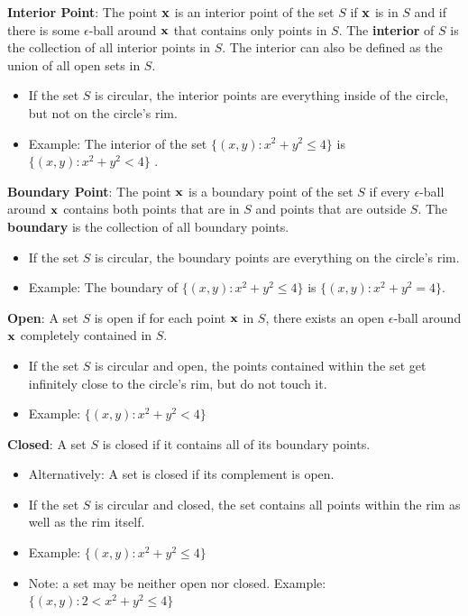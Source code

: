 \documentclass[]{book}
\providecommand{\tightlist}{%
  \setlength{\itemsep}{0pt}\setlength{\parskip}{0pt}}
\theoremstyle{definition}
\theoremstyle{definition}
\theoremstyle{definition}
\theoremstyle{remark}
\begin{document}
\textbf{Interior Point}: The point \(\bf x\) is an interior point of the
set \(S\) if \(\bf x\) is in \(S\) and if there is some
\(\epsilon\)-ball around \(\bf x\) that contains only points in \(S\).
The \textbf{interior} of \(S\) is the collection of all interior points
in \(S\). The interior can also be defined as the union of all open sets
in \(S\).

\begin{itemize}
\tightlist
\item
  If the set \(S\) is circular, the interior points are everything
  inside of the circle, but not on the circle's rim.
\item
  Example: The interior of the set \(\{ (x,y) : x^2+y^2\le 4 \}\) is
  \(\{ (x,y) : x^2+y^2< 4 \}\) .
\end{itemize}

\textbf{Boundary Point}: The point \(\bf x\) is a boundary point of the
set \(S\) if every \(\epsilon\)-ball around \(\bf x\) contains both
points that are in \(S\) and points that are outside \(S\). The
\textbf{boundary} is the collection of all boundary points.

\begin{itemize}
\tightlist
\item
  If the set \(S\) is circular, the boundary points are everything on
  the circle's rim.
\item
  Example: The boundary of \(\{ (x,y) : x^2+y^2\le 4 \}\) is
  \(\{ (x,y) : x^2+y^2 = 4 \}\).
\end{itemize}

\textbf{Open}: A set \(S\) is open if for each point \(\bf x\) in \(S\),
there exists an open \(\epsilon\)-ball around \(\bf x\) completely
contained in \(S\).

\begin{itemize}
\tightlist
\item
  If the set \(S\) is circular and open, the points contained within the
  set get infinitely close to the circle's rim, but do not touch it.
\item
  Example: \(\{ (x,y) : x^2+y^2<4 \}\)
\end{itemize}

\textbf{Closed}: A set \(S\) is closed if it contains all of its
boundary points.

\begin{itemize}
\tightlist
\item
  Alternatively: A set is closed if its complement is open.
\item
  If the set \(S\) is circular and closed, the set contains all points
  within the rim as well as the rim itself.
\item
  Example: \(\{ (x,y) : x^2+y^2\le 4 \}\)
\item
  Note: a set may be neither open nor closed. Example:
  \(\{ (x,y) : 2 < x^2+y^2\le 4 \}\)
\end{itemize}
\end{document}
